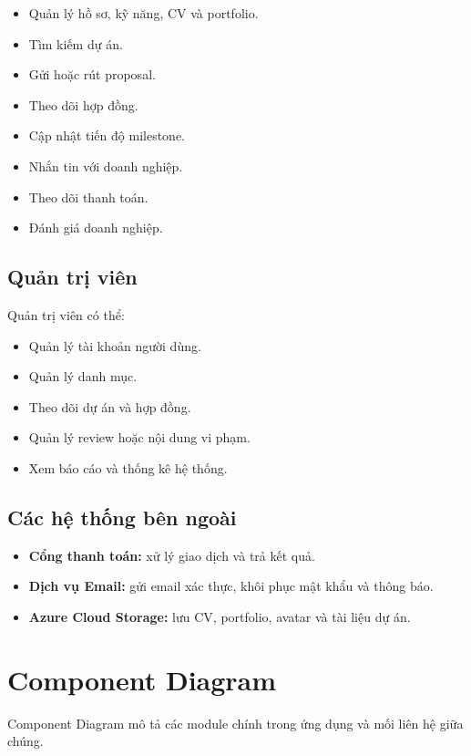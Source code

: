 \begin{itemize}
    \item Quản lý hồ sơ, kỹ năng, CV và portfolio.
    \item Tìm kiếm dự án.
    \item Gửi hoặc rút proposal.
    \item Theo dõi hợp đồng.
    \item Cập nhật tiến độ milestone.
    \item Nhắn tin với doanh nghiệp.
    \item Theo dõi thanh toán.
    \item Đánh giá doanh nghiệp.
\end{itemize}

\subsection{Quản trị viên}

Quản trị viên có thể:

\begin{itemize}
    \item Quản lý tài khoản người dùng.
    \item Quản lý danh mục.
    \item Theo dõi dự án và hợp đồng.
    \item Quản lý review hoặc nội dung vi phạm.
    \item Xem báo cáo và thống kê hệ thống.
\end{itemize}

\subsection{Các hệ thống bên ngoài}

\begin{itemize}
    \item \textbf{Cổng thanh toán:} xử lý giao dịch và trả kết quả.
    \item \textbf{Dịch vụ Email:} gửi email xác thực, khôi phục mật khẩu và thông báo.
    \item \textbf{Azure Cloud Storage:} lưu CV, portfolio, avatar và tài liệu dự án.
\end{itemize}

\section{Component Diagram}
\label{sec:component-diagram}

Component Diagram mô tả các module chính trong ứng dụng và mối liên hệ giữa chúng.


